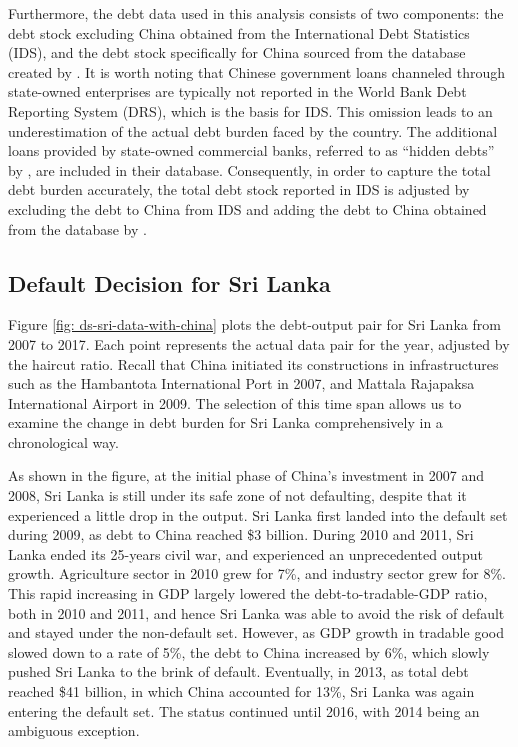 Furthermore, the debt data used in this analysis consists of two components: the debt stock excluding China obtained from the International Debt Statistics (IDS), and the debt stock specifically for China sourced from the database created by \citet*{Horn-Reinhart-Trebesch-21}. It is worth noting that Chinese government loans channeled through state-owned enterprises are typically not reported in the World Bank Debt Reporting System (DRS), which is the basis for IDS. This omission leads to an underestimation of the actual debt burden faced by the country. The additional loans provided by state-owned commercial banks, referred to as ``hidden debts'' by \citet*{Horn-Reinhart-Trebesch-21}, are included in their database. Consequently, in order to capture the total debt burden accurately, the total debt stock reported in IDS is adjusted by excluding the debt to China from IDS and adding the debt to China obtained from the database by \citet*{Horn-Reinhart-Trebesch-21}.

\subsection{Default Decision for Sri Lanka}

Figure \ref{fig: ds-sri-data-with-china} plots the debt-output pair for Sri Lanka from 2007 to 2017. Each point represents the actual data pair for the year, adjusted by the haircut ratio. Recall that China initiated its constructions in infrastructures such as the Hambantota International Port in 2007, and Mattala Rajapaksa International Airport in 2009. The selection of this time span allows us to examine the change in debt burden for Sri Lanka comprehensively in a chronological way.

As shown in the figure, at the initial phase of China's investment in 2007 and 2008, Sri Lanka is still under its safe zone of not defaulting, despite that it experienced a little drop in the output. Sri Lanka first landed into the default set during 2009, as debt to China reached \$3 billion. During 2010 and 2011, Sri Lanka ended its 25-years civil war, and experienced an unprecedented output growth. Agriculture sector in 2010 grew for 7\%, and industry sector grew for 8\%. This rapid increasing in GDP largely lowered the debt-to-tradable-GDP ratio, both in 2010 and 2011, and hence Sri Lanka was able to avoid the risk of default and stayed under the non-default set. However, as GDP growth in tradable good slowed down to a rate of 5\%, the debt to China increased by 6\%, which slowly pushed Sri Lanka to the brink of default. Eventually, in 2013, as total debt reached \$41 billion, in which China accounted for 13\%, Sri Lanka was again entering the default set. The status continued until 2016, with 2014 being an ambiguous exception.

